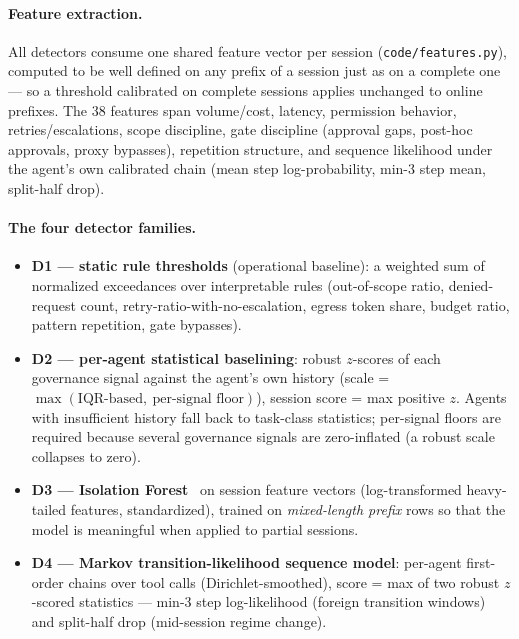 \documentclass[10pt]{article}
\newcommand{\code}[1]{\texttt{#1}}
\begin{document}
\paragraph{Feature extraction.} All detectors consume one shared feature vector
per session (\code{code/features.py}), computed to be well defined on any
prefix of a session just as on a complete one --- so a threshold calibrated on
complete sessions applies unchanged to online prefixes. The 38 features span
volume/cost, latency, permission behavior, retries/escalations, scope
discipline, gate discipline (approval gaps, post-hoc approvals, proxy
bypasses), repetition structure, and sequence likelihood under the agent's own
calibrated chain (mean step log-probability, min-3 step mean, split-half
drop).

\paragraph{The four detector families.}
\begin{itemize}
  \item \textbf{D1 --- static rule thresholds} (operational baseline): a
        weighted sum of normalized exceedances over interpretable rules
        (out-of-scope ratio, denied-request count, retry-ratio-with-no-escalation,
        egress token share, budget ratio, pattern repetition, gate bypasses).
  \item \textbf{D2 --- per-agent statistical baselining}: robust $z$-scores of
        each governance signal against the agent's own history (scale =
        $\max(\text{IQR-based},\ \text{per-signal floor})$), session score =
        max positive $z$. Agents with insufficient history fall back to
        task-class statistics; per-signal floors are required because several
        governance signals are zero-inflated (a robust scale collapses to zero).
  \item \textbf{D3 --- Isolation Forest}~\cite{iforest} on session feature
        vectors (log-transformed heavy-tailed features, standardized), trained
        on \emph{mixed-length prefix} rows so that the model is meaningful when
        applied to partial sessions.
  \item \textbf{D4 --- Markov transition-likelihood sequence model}:
        per-agent first-order chains over tool calls (Dirichlet-smoothed),
        score = max of two robust $z$-scored statistics --- min-3 step
        log-likelihood (foreign transition windows) and split-half drop
        (mid-session regime change).
\end{itemize}
\end{document}
